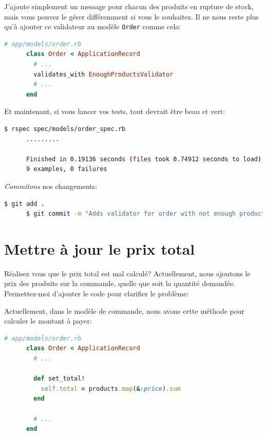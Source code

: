 \documentclass[]{report}
\begin{document}
    J'ajoute simplement un message pour chacun des produits en rupture de stock, mais vous pouvez le gérer différemment si vous le souhaitez. Il ne nous reste plus qu'à ajouter ce validateur au modèle \verb|Order| comme cela:

    \begin{scriptsize}
      \begin{lstlisting}[language=ruby]
      # app/models/order.rb
      class Order < ApplicationRecord
        # ...
        validates_with EnoughProductsValidator
        # ...
      end
      \end{lstlisting}
    \end{scriptsize}

    Et maintenant, si vous lancer vos tests, tout devrait être beau et vert:

    \begin{scriptsize}
      \begin{lstlisting}[language=bash]
      $ rspec spec/models/order_spec.rb
      .........

      Finished in 0.19136 seconds (files took 0.74912 seconds to load)
      9 examples, 0 failures
      \end{lstlisting}
    \end{scriptsize}

    \textit{Commitons} nos changements:

    \begin{scriptsize}
      \begin{lstlisting}[language=bash]
      $ git add .
      $ git commit -m "Adds validator for order with not enough products on stock"
      \end{lstlisting}
    \end{scriptsize}

  \section{Mettre à jour le prix total}

    Réalisez vous que le prix total est mal calculé?  Actuellement, nous ajoutons le prix des produits sur la commande, quelle que soit la quantité demandée. Permettez-moi d'ajouter le code pour clarifier le problème:

    Actuellement, dans le modèle de commande, nous avons cette méthode pour calculer le montant à payer:

    \begin{scriptsize}
      \begin{lstlisting}[language=ruby]
      # app/models/order.rb
      class Order < ApplicationRecord
        # ...

        def set_total!
          self.total = products.map(&:price).sum
        end

        # ...
      end
      \end{lstlisting}
    \end{scriptsize}
\end{document}
